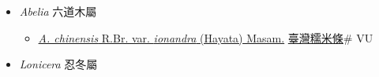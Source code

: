 
  \begin{itemize}
 \item[] \textit{Abelia} 六道木屬
                    
  \begin{itemize}
        \item[] \href{http://www.theplantlist.org/tpl1.1/search?q=Abelia+chinensis+var.+ionandra}{\textit{A. chinensis} R.Br. var. \textit{ionandra} (Hayata) Masam.}   \href{\detokenize{http://taibnet.sinica.edu.tw/chi/taibnet_species_list.php?T2=臺灣糯米條&T2_new_value=true&fr=y}}{臺灣糯米條}\# VU
  \end{itemize}
 \item[] \textit{Lonicera} 忍冬屬
                    

\end{itemize}
